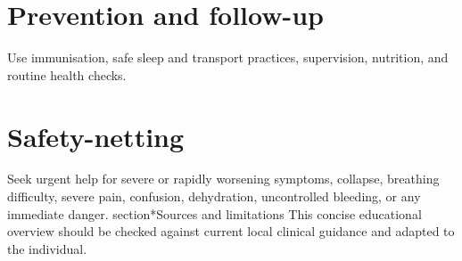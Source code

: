 \section*{Prevention and follow-up}
Use immunisation, safe sleep and transport practices, supervision, nutrition, and routine health checks.
\section*{Safety-netting}
Seek urgent help for severe or rapidly worsening symptoms, collapse, breathing difficulty, severe pain, confusion, dehydration, uncontrolled bleeding, or any immediate danger.
section*{Sources and limitations}
This concise educational overview should be checked against current local clinical guidance and adapted to the individual.
